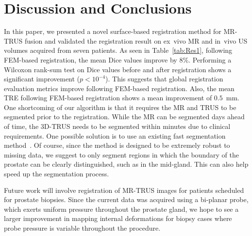 \documentclass[runningheads,a4paper]{llncs}
\begin{document}
\section{Discussion and Conclusions}

In this paper, we presented a novel surface-based registration method for MR-TRUS fusion and validated the registration result on ex~vivo MR and in~vivo US volumes acquired from seven patients. As seen in Table~\ref{tab:Res1}, following FEM-based registration, the mean Dice values improve by $8\%$. Performing a Wilcoxon rank-sum test on Dice values before and after registration shows a significant improvement ($p<10^{-4}$). This suggests that global registration evaluation metrics improve following FEM-based registration. Also, the mean TRE following FEM-based registration shows a mean improvement of $0.5$~mm. One shortcoming of our algorithm is that it requires the MR and TRUS to be segmented prior to the registration. While the MR can be segmented days ahead of time, the 3D-TRUS needs to be segmented within minutes due to clinical requirements. One possible solution is to use an existing fast segmentation method~\cite{Qiu12a}.  Of course, since the method is designed to be extremely robust to missing data, we suggest to only segment regions in which the boundary of the prostate can be clearly distinguished, such as in the mid-gland.  This can also help speed up the segmentation process.

Future work will involve registration of MR-TRUS images for patients scheduled for prostate biopsies. Since the current data was acquired using a bi-planar probe, which exerts uniform pressure throughout the prostate gland, we hope to see a larger improvement in mapping internal deformations for biopsy cases where probe pressure is variable throughout the procedure.



\end{document}
